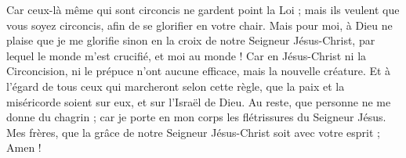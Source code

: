 \begin{multicols}{2}
Car ceux-là même qui sont circoncis ne gardent point la Loi ; mais ils veulent que vous soyez circoncis, afin de se glorifier en votre chair.
Mais pour moi, à Dieu ne plaise que je me glorifie sinon en la croix de notre Seigneur Jésus-Christ, par lequel le monde m'est crucifié, et moi au monde !
Car en Jésus-Christ ni la Circoncision, ni le prépuce n'ont aucune efficace, mais la nouvelle créature.
Et à l'égard de tous ceux qui marcheront selon cette règle, que la paix et la miséricorde soient sur eux, et sur l'Israël de Dieu.
Au reste, que personne ne me donne du chagrin ; car je porte en mon corps les flétrissures du Seigneur Jésus.
Mes frères, que la grâce de notre Seigneur Jésus-Christ soit avec votre esprit ; Amen !
\PPE{}
\end{multicols}
